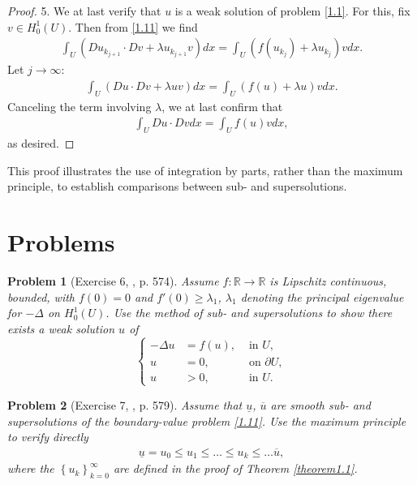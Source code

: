 \documentclass[11pt,a4paper,center,notitlepage]{article}
\numberwithin{equation}{section}
\newtheorem{prob}{Problem}[section]
\begin{document}
\begin{proof}
5. We at last verify that $u$ is a weak solution of problem \eqref{1.1}. For this, fix $v\in H_0^1\left(U\right)$. Then from \eqref{1.11}  we find
\begin{align}
\int_U {\left( {D{u_{{k_{j + 1}}}} \cdot Dv + \lambda {u_{{k_{j + 1}}}}v} \right)dx}  = \int_U {\left( {f\left( {{u_{{k_j}}}} \right) + \lambda {u_{{k_j}}}} \right)vdx} .
\end{align}
Let $j\to \infty$: 
\begin{align}
\int_U {\left( {Du \cdot Dv + \lambda uv} \right)dx}  = \int_U {\left( {f\left( u \right) + \lambda u} \right)vdx} .
\end{align}
Canceling the term involving $\lambda$, we at last confirm that
\begin{align}
\int_U {Du \cdot Dvdx}  = \int_U {f\left( u \right)vdx} ,
\end{align}
as desired.
\end{proof}
This proof illustrates the use of integration by parts, rather than the maximum principle, to establish comparisons between sub- and supersolutions. 



\section{Problems}
\begin{prob}[Exercise 6, \cite{1}, p. 574]
Assume $f:\mathbb{R}\to \mathbb{R}$ is Lipschitz continuous, bounded, with $f\left(0\right) =0$ and $f'\left(0\right) \ge \lambda _1$, $\lambda _1$ denoting the principal eigenvalue for $-\Delta$ on $H_0^1\left(U\right)$. Use the method of sub- and supersolutions to show there exists a weak solution $u$ of 
\begin{equation}
\left\{ \begin{split}
- \Delta u &= f\left( u \right),& \mbox{ in } U,\\
u &= 0,& \mbox{ on } \partial U,\\
u &> 0,& \mbox{ in } U.
\end{split} \right.
\end{equation}
\end{prob}

\begin{prob}[Exercise 7, \cite{1}, p. 579]
Assume that $\underline{u}$, $\overline{u}$ are smooth sub- and supersolutions of the boundary-value problem \eqref{1.11}. Use the maximum principle to verify directly
\begin{align}
\underline{u} =u_0 \le u_1 \le \ldots \le u_k \le \ldots \overline{u} ,
\end{align}
where the $\left\{ {{u_k}} \right\}_{k = 0}^\infty $ are defined in the proof of Theorem \ref{theorem1.1}.
\end{prob}
\end{document}
